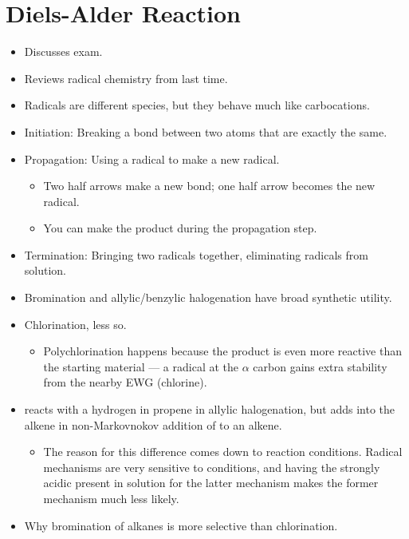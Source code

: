\documentclass[../notes.tex]{subfiles}
\begin{document}
\section{Diels-Alder Reaction}
\begin{itemize}
    \item {}Discusses exam.
    \item Reviews radical chemistry from last time.
    \item Radicals are different species, but they behave much like carbocations.
    \item Initiation: Breaking a bond between two atoms that are exactly the same.
    \item Propagation: Using a radical to make a new radical.
    \begin{itemize}
        \item Two half arrows make a new bond; one half arrow becomes the new radical.
        \item You can make the product during the propagation step.
    \end{itemize}
    \item Termination: Bringing two radicals together, eliminating radicals from solution.
    \item Bromination and allylic/benzylic halogenation have broad synthetic utility.
    \item Chlorination, less so.
    \begin{itemize}
        \item Polychlorination happens because the product is even more reactive than the starting material --- a radical at the $\alpha$ carbon gains extra stability from the nearby EWG (chlorine).
    \end{itemize}
    \item {} reacts with a hydrogen in propene in allylic halogenation, but adds into the alkene in non-Markovnokov addition of  to an alkene.
    \begin{itemize}
        \item The reason for this difference comes down to reaction conditions. Radical mechanisms are very sensitive to conditions, and having the strongly acidic  present in solution for the latter mechanism makes the former mechanism much less likely.
    \end{itemize}
    \item Why bromination of alkanes is more selective than chlorination.
    \begin{itemize}

\end{itemize}
\end{itemize}
\end{document}
